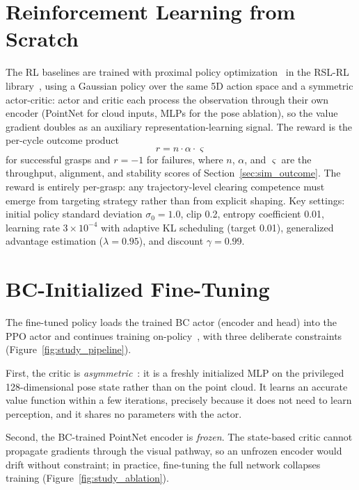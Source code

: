 \section{Reinforcement Learning from Scratch}
\label{sec:study_rl}

The RL baselines are trained with proximal policy
optimization~\cite{schulman2017ppo} in the RSL-RL
library~\cite{schwarke2025rslrl}, using a Gaussian policy over the same 5D
action space and a symmetric actor-critic: actor and critic each process the
observation through their own encoder (PointNet for cloud inputs, MLPs for
the pose ablation), so the value gradient doubles as an auxiliary
representation-learning signal. The reward is the per-cycle outcome product
\begin{equation}
  r = n \cdot \alpha \cdot \varsigma
  \label{eq:study_reward}
\end{equation}
for successful grasps and $r = -1$ for failures, where $n$, $\alpha$, and
$\varsigma$ are the throughput, alignment, and stability scores of
Section~\ref{sec:sim_outcome}. The reward is entirely per-grasp: any
trajectory-level clearing competence must emerge from targeting strategy
rather than from explicit shaping. Key settings: initial policy standard
deviation $\sigma_0 = 1.0$, clip 0.2, entropy coefficient 0.01, learning rate
$3 \times 10^{-4}$ with adaptive KL scheduling (target 0.01), generalized
advantage estimation ($\lambda = 0.95$), and discount $\gamma = 0.99$.

\section{BC-Initialized Fine-Tuning}
\label{sec:study_bcrl}

The fine-tuned policy loads the trained BC actor (encoder and head) into the
PPO actor and continues training on-policy~\cite{rajeswaran2018learning,
nair2018overcoming}, with three deliberate constraints
(Figure~\ref{fig:study_pipeline}).

First, the critic is \emph{asymmetric}~\cite{pinto2018asymmetric}: it is a
freshly initialized MLP on the privileged 128-dimensional pose state rather
than on the point cloud. It learns an accurate value function within a few
iterations, precisely because it does not need to learn perception, and it
shares no parameters with the actor.

Second, the BC-trained PointNet encoder is \emph{frozen}. The state-based
critic cannot propagate gradients through the visual pathway, so an unfrozen
encoder would drift without constraint; in practice, fine-tuning the full
network collapses training (Figure~\ref{fig:study_ablation}).

